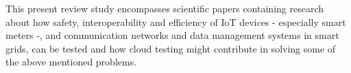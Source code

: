 This present review study encompasses scientific papers containing research about how safety, interoperability and efficiency of IoT devices - especially smart meters -, and communication networks and data management systems in smart grids, can be tested and how cloud testing might contribute in solving some of the above mentioned problems.
